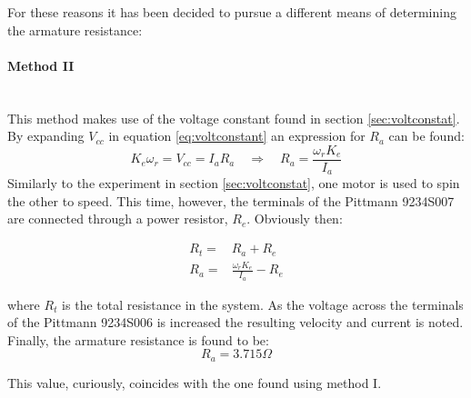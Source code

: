 For these reasons it has been decided to pursue a different means of determining the armature resistance:
\paragraph{Method II}~\\
This method makes use of the voltage constant found in section \ref{sec:voltconstat}.
By expanding $V_{cc}$ in equation \ref{eq:voltconstant} an expression for $R_a$ can be found:
\begin{equation}
	\label{eq:voltconstantexpanded}
	K_e\omega_r = V_{cc} = I_aR_a\quad \Rightarrow \quad R_a = \frac{\omega_rK_e}{I_a}
\end{equation}
Similarly to the experiment in section \ref{sec:voltconstat}, one motor is used to spin the other to speed.
This time, however, the terminals of the Pittmann 9234S007 are connected through a power resistor, $R_e$.
Obviously then:

\begin{eqnarray}
	R_t =& R_a + R_e\\
	R_a =& \frac{\omega_rK_e}{I_a}-R_e
\end{eqnarray}

where $R_t$ is the total resistance in the system.
As the voltage across the terminals of the Pittmann 9234S006 is increased the resulting velocity and current is noted.
Finally, the armature resistance is found to be:
$$R_a = 3.715\Omega$$

This value, curiously, coincides with the one found using method I.

